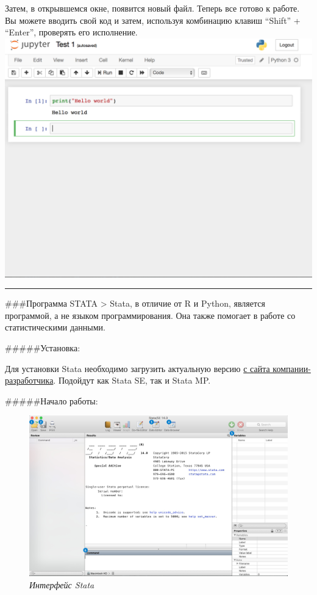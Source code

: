 \documentclass[]{book}
\begin{document}
Затем, в открывшемся окне, появится новый файл. Теперь все готово к работе. Вы можете вводить свой код и затем, используя комбинацию клавиш ``Shift'' + ``Enter'', проверять его исполнение.
\includegraphics{images/Code in Jupyter.png}

\begin{center}\rule{0.5\linewidth}{\linethickness}\end{center}

\#\#\#Программа STATA
\textgreater{} Stata, в отличие от R и Python, является программой, а не языком программирования. Она также помогает в работе со статистическими данными.

\#\#\#\#\#Установка:

Для установки Stata необходимо загрузить актуальную версию \href{https://www.stata.com/}{с сайта компании-разработчика}. Подойдут как Stata SE, так и Stata MP.

\#\#\#\#\#Начало работы:

\begin{figure}
\centering
\includegraphics{images/Stata Interface.jpg}
\caption{\emph{Интерфейс Stata}}
\end{figure}
\end{document}
